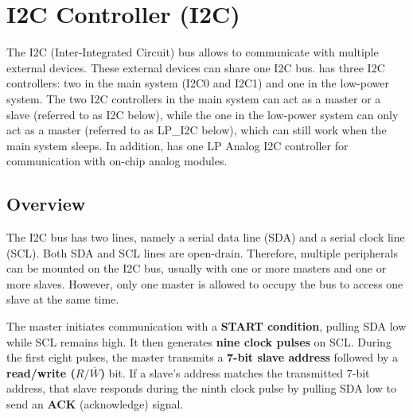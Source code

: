 \documentclass[main\_\_EN.tex]{subfiles}
\begin{document}
\setenglishformatting

\ifglobal
\else
    \clearpage
    \listoftodos
    \listofdonetodos
    \tableofcontents
\fi



\hypertarget{i2c}{}
\chapter{I2C Controller (I2C)}
\label{mod:i2c}


The I2C (Inter-Integrated Circuit) bus allows \chipname{} to communicate with multiple external devices. These external devices can share one I2C bus. \chipname{} has three I2C controllers: two in the main system (I2C0 and I2C1) and one in the low-power system. The two I2C controllers in the main system can act as a master or a slave (referred to as I2C below), while the one in the low-power system can only act as a master (referred to as LP\_I2C below), which can still work when the main system sleeps. In addition, \chipname{} has one LP Analog I2C controller for communication with on-chip analog modules.


\section{Overview}
The I2C bus has two lines, namely a serial data line (SDA) and a serial clock line (SCL). Both SDA and SCL lines are open-drain. Therefore, multiple peripherals can be mounted on the I2C bus, usually with one or more masters and one or more slaves. However, only one master is allowed to occupy the bus to access one slave at the same time.



The master initiates communication with a \textbf{START condition}, pulling SDA low while SCL remains high. It then generates \textbf{nine clock pulses} on SCL. During the first eight pulses, the master transmits a \textbf{7-bit slave address} followed by a \textbf{read/write ($R/\overline W$)} bit. If a slave's address matches the transmitted 7-bit address, that slave responds during the ninth clock pulse by pulling SDA low to send an \textbf{ACK} (acknowledge) signal.
\end{document}
